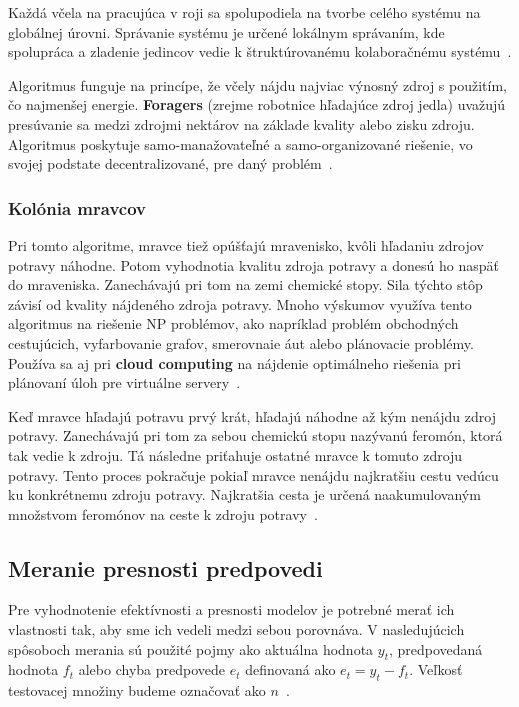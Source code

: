 \documentclass[a4paper,slovak,12pt,appendix]{article}
\begin{document}
Každá včela na pracujúca v roji sa spolupodiela na tvorbe celého systému na
globálnej úrovni. Správanie systému je určené lokálnym správaním, kde spolupráca
a zladenie jedincov vedie k štruktúrovanému kolaboračnému systému~\cite{Chavan2015}.

Algoritmus funguje na princípe, že včely nájdu najviac výnosný zdroj
s použitím, čo najmenšej energie. \textbf{Foragers} (zrejme robotnice hľadajúce zdroj jedla) uvažujú
presúvanie sa medzi zdrojmi nektárov na základe kvality alebo zisku zdroju.
Algoritmus poskytuje samo-manažovateľné a samo-organizované riešenie, vo svojej
podstate decentralizované, pre daný problém~\cite{Buhussain2016}.


\subsubsection{Kolónia mravcov}
Pri tomto algoritme, mravce tiež opúšťajú mravenisko, kvôli hľadaniu zdrojov
potravy náhodne. Potom vyhodnotia kvalitu zdroja potravy a donesú ho naspäť do
mraveniska. Zanechávajú pri tom na zemi chemické stopy. Sila týchto stôp závisí
od kvality nájdeného zdroja potravy. Mnoho výskumov využíva tento algoritmus na
riešenie NP problémov, ako napríklad problém obchodných cestujúcich,
vyfarbovanie grafov, smerovnaie áut alebo plánovacie problémy. Používa sa aj pri
\textbf{cloud computing} na nájdenie optimálneho riešenia pri plánovaní úloh
pre virtuálne servery~\cite{Buhussain2016}.

Keď mravce hľadajú potravu prvý krát, hľadajú náhodne až kým nenájdu zdroj
potravy. Zanechávajú pri tom za sebou chemickú stopu nazývanú feromón, ktorá
tak vedie k zdroju. Tá následne priťahuje ostatné mravce k tomuto zdroju
potravy. Tento proces pokračuje pokiaľ mravce nenájdu najkratšiu cestu vedúcu
ku konkrétnemu zdroju potravy. Najkratšia cesta je určená naakumulovaným
množstvom feromónov na ceste k zdroju potravy~\cite{Buhussain2016}.


\subsection{Meranie presnosti predpovedi}
Pre vyhodnotenie efektívnosti a presnosti modelov je potrebné merať ich
vlastnosti tak, aby sme ich vedeli medzi sebou porovnáva. V nasledujúcich
spôsoboch merania sú použité pojmy ako aktuálna hodnota $y_t$, predpovedaná
hodnota $f_t$ alebo chyba predpovede $e_t$ definovaná ako $e_t = y_t - f_t$.
Veľkosť testovacej množiny budeme označovať ako $n$~\cite{Agrawal2013}.
\end{document}
